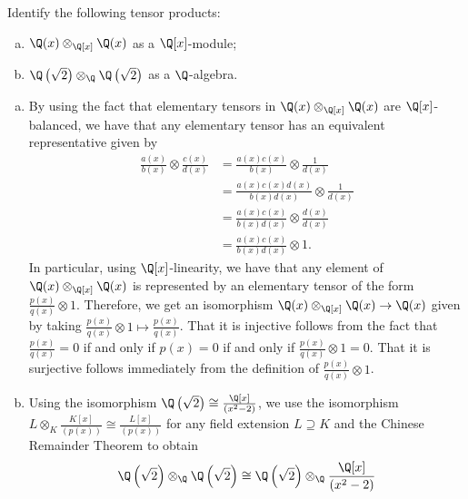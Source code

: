 \documentclass[10pt]{mypackage}
\begin{document}
\begin{problem}[Problem 5]
  Identify the following tensor products:
  \begin{enumerate}[(a)]
    \item $\Q(x)\otimes_{\Q[x]}\Q(x)$ as a $\Q[x]$-module;
    \item $\Q\left( \sqrt{2} \right)\otimes_{\Q}\Q\left( \sqrt{2} \right)$ as a $\Q$-algebra.
  \end{enumerate}
\end{problem}
\begin{solution}\hfill
  \begin{enumerate}[(a)]
    \item By using the fact that elementary tensors in $\Q(x)\otimes_{\Q[x]}\Q(x)$ are $\Q[x]$-balanced, we have that any elementary tensor has an equivalent representative given by
      \begin{align*}
        \frac{a(x)}{b(x)} \otimes \frac{c(x)}{d(x)} &= \frac{a(x)c(x)}{b(x)}\otimes \frac{1}{d(x)}\\
                                                    &= \frac{a(x)c(x)d(x)}{b(x)d(x)}\otimes \frac{1}{d(x)}\\
                                                    &= \frac{a(x)c(x)}{b(x)d(x)} \otimes \frac{d(x)}{d(x)}\\
                                                    &= \frac{a(x)c(x)}{b(x)d(x)}\otimes 1.
      \end{align*}
      In particular, using $\Q[x]$-linearity, we have that any element of $\Q(x)\otimes_{\Q[x]}\Q(x)$ is represented by an elementary tensor of the form $\frac{p(x)}{q(x)}\otimes 1$. Therefore, we get an isomorphism $\Q(x)\otimes_{\Q[x]}\Q(x)\rightarrow \Q(x)$ given by taking $\frac{p(x)}{q(x)}\otimes 1\mapsto \frac{p(x)}{q(x)}$. That it is injective follows from the fact that $\frac{p(x)}{q(x)} = 0$ if and only if $p(x) = 0$ if and only if $\frac{p(x)}{q(x)}\otimes 1 = 0$. That it is surjective follows immediately from the definition of $\frac{p(x)}{q(x)}\otimes 1$.
    \item Using the isomorphism $\Q\left( \sqrt{2} \right)\cong \frac{\Q[x]}{\left( x^2-2 \right)}$, we use the isomorphism $L\otimes_{K} \frac{K[x]}{\left( p(x) \right)}\cong \frac{L[x]}{\left( p(x) \right)}$ for any field extension $L\supseteq K$ and the Chinese Remainder Theorem to obtain
      \begin{align*}
        \Q\left( \sqrt{2} \right)\otimes_{\Q} \Q\left( \sqrt{2} \right) &\cong \Q\left( \sqrt{2} \right)\otimes_{\Q} \frac{\Q[x]}{\left( x^2-2 \right)}\\

\end{align*}
\end{enumerate}
\end{solution}
\end{document}
